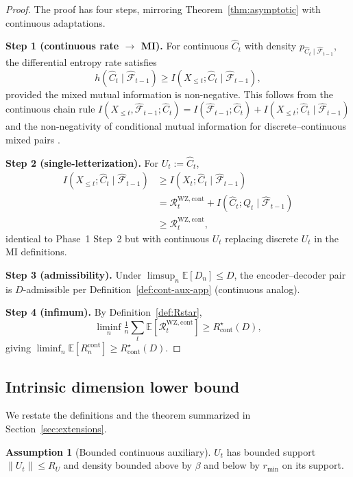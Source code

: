 \documentclass[11pt]{article}
\newcommand{\E}{\mathbb{E}}
\newcommand{\F}{\mathcal{F}}
\theoremstyle{plain}
\theoremstyle{definition}
\newtheorem{assumption}[theorem]{Assumption}
\theoremstyle{remark}
\begin{document}
\begin{proof}
The proof has four steps, mirroring Theorem~\ref{thm:asymptotic} with
continuous adaptations.

\textbf{Step 1 (continuous rate $\to$ MI).}
For continuous $\hat C_t$ with density $p_{\hat C_t \mid \hat{\F}_{t-1}}$,
the differential entropy rate satisfies
\[
h(\hat C_t \mid \hat{\F}_{t-1})
\geq I(X_{\leq t}; \hat C_t \mid \hat{\F}_{t-1}),
\]
provided the mixed mutual information is non-negative. This follows
from the continuous chain rule
$I(X_{\leq t}, \hat{\F}_{t-1}; \hat C_t) = I(\hat{\F}_{t-1}; \hat C_t) + I(X_{\leq t}; \hat C_t \mid \hat{\F}_{t-1})$
and the non-negativity of conditional mutual information for
discrete--continuous mixed pairs
\citep[Theorem 8.4.1]{cover2006elements}.

\textbf{Step 2 (single-letterization).}
For $U_t := \hat C_t$,
\begin{align*}
I(X_{\leq t}; \hat C_t \mid \hat{\F}_{t-1})
&\geq I(X_t; \hat C_t \mid \hat{\F}_{t-1}) \\
&= \mathcal{R}_t^{\mathrm{WZ},\mathrm{cont}}
  + I(\hat C_t; Q_t \mid \hat{\F}_{t-1}) \\
&\geq \mathcal{R}_t^{\mathrm{WZ},\mathrm{cont}},
\end{align*}
identical to Phase~1 Step~2 but with continuous $U_t$ replacing
discrete $U_t$ in the MI definitions.

\textbf{Step 3 (admissibility).} Under $\limsup_n \E[D_n] \leq D$, the
encoder--decoder pair is $D$-admissible per
Definition~\ref{def:cont-aux-app} (continuous analog).

\textbf{Step 4 (infimum).} By Definition~\ref{def:Rstar},
\[
\liminf_n \tfrac{1}{n}\sum_t \E[\mathcal{R}_t^{\mathrm{WZ},\mathrm{cont}}]
\geq R^\star_{\mathrm{cont}}(D),
\]
giving $\liminf_n \E[R_n^{\mathrm{cont}}] \geq R^\star_{\mathrm{cont}}(D)$.
\end{proof}

\subsection{Intrinsic dimension lower bound}\label{app:cont-intrinsic}

We restate the definitions and the theorem summarized in
Section~\ref{sec:extensions}.

\begin{assumption}[Bounded continuous auxiliary]
\label{ass:cont-support}
$U_t$ has bounded support $\|U_t\| \leq R_U$ and density bounded
above by $\beta$ and below by $r_{\min}$ on its support.
\end{assumption}
\end{document}

